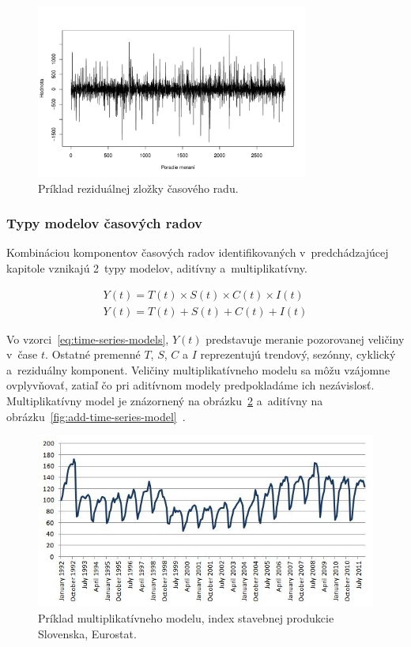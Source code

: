 \documentclass[a4paper,twoside,slovak,12pt,appendix]{article}
\begin{document}
\begin{figure}[]
  \centering
  \includegraphics[width=0.8\textwidth]{random_component.pdf}
  \caption{Príklad reziduálnej zložky časového radu.}
  \label{fig:random-component}
\end{figure}

\subsubsection{Typy modelov časových radov}
Kombináciou komponentov časových radov identifikovaných v~predchádzajúcej
kapitole vznikajú 2~typy modelov, aditívny a~multiplikatívny.

\begin{equation}
  \begin{split}
    Y(t) = T(t) \times S(t) \times C(t) \times I(t)
    \\
    Y(t) = T(t) + S(t) + C(t) + I(t)
  \end{split}
  \label{eq:time-series-models}
\end{equation}

Vo vzorci~\ref{eq:time-series-models}, $Y(t)$ predstavuje meranie pozorovanej
veličiny v~čase $t$. Ostatné premenné $T$, $S$, $C$ a $I$ reprezentujú trendový,
sezónny, cyklický a~reziduálny komponent. Veličiny multiplikatívneho modelu sa
môžu vzájomne ovplyvňovať, zatiaľ čo pri aditívnom modely predpokladáme ich
nezávislosť. Multiplikatívny model je znázornený na
obrázku~\ref{fig:multi-time-series-model} a~aditívny na
obrázku~\ref{fig:add-time-series-model}~\cite{Agrawal2013}.

\begin{figure}[!ht]
  \centering
	\captionsetup{justification=centering}
  \includegraphics[width=\textwidth]{multi_model.jpg}
  \caption[Príklad multiplikatívneho modelu.]{Príklad multiplikatívneho modelu, index stavebnej produkcie Slovenska, Eurostat.}
  \label{fig:multi-time-series-model}
\end{figure}
\end{document}
